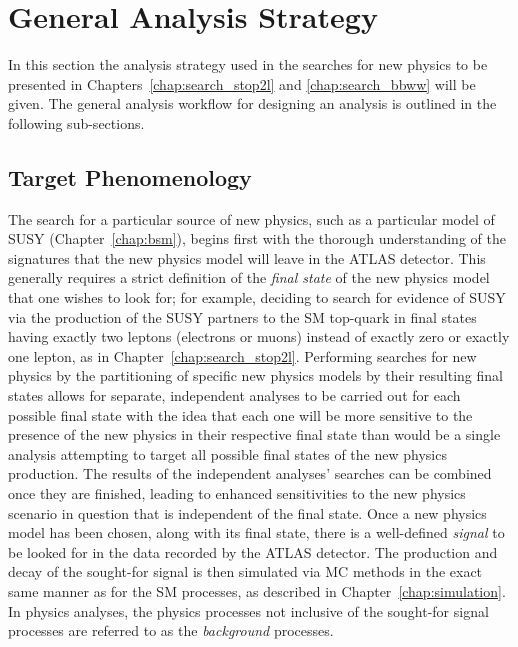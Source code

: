 \section{General Analysis Strategy}
\label{sec:gen_strategy}

In this section the analysis strategy used in the searches for new physics
to be presented in Chapters~\ref{chap:search_stop2l} and \ref{chap:search_bbww}
will be given.
The general analysis workflow for designing an analysis is outlined in the following
sub-sections.

\subsection{Target Phenomenology}
\label{sec:sig_pheno}

The search for a particular source of new physics, such as a particular model of SUSY (Chapter~\ref{chap:bsm}),
begins first with the thorough understanding of the signatures that the new physics model
will leave in the ATLAS detector.
This generally requires a strict definition of the \textit{final state} of the
new physics model that one wishes to look for; for example, deciding to search for
evidence of SUSY via the production of the SUSY partners to the SM top-quark
in final states having exactly two leptons (electrons or muons) instead of
exactly zero or exactly one lepton, as in Chapter~\ref{chap:search_stop2l}.
Performing searches for new physics by the partitioning of specific new physics models
by their resulting final states allows for separate, independent analyses to be carried out
for each possible final state with the idea that each one will be more sensitive
to the presence of the new physics in their respective final state than would be
a single analysis attempting to target all possible final states of the new physics production.
The results of the independent analyses' searches can be combined once they are finished,
leading to enhanced sensitivities to the new physics scenario in question that is independent
of the final state.
Once a new physics model has been chosen, along with its final state, there is a well-defined
\textit{signal} to be looked for in the data recorded by the ATLAS detector.
The production and decay of the sought-for signal is then simulated via MC methods in the exact
same manner as for the SM processes, as described in Chapter~\ref{chap:simulation}.
In physics analyses, the physics processes not inclusive of the sought-for signal processes
are referred to as the \textit{background} processes.

